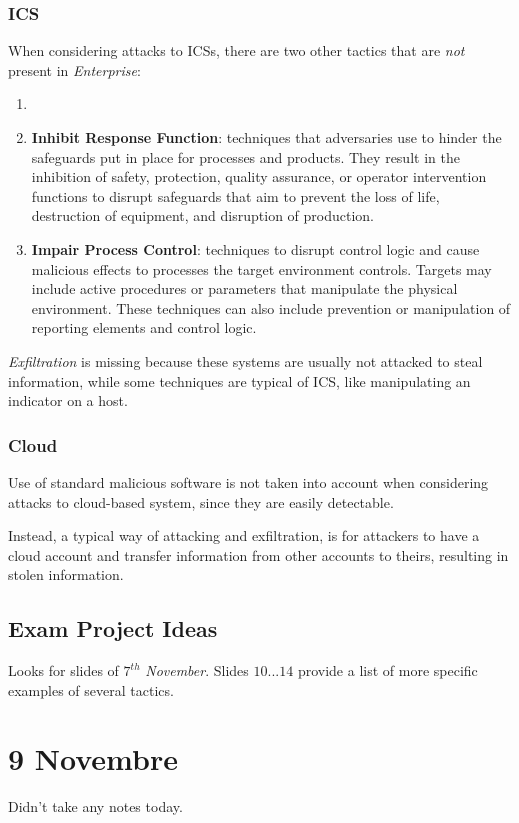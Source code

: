 \subsubsection{ICS}
When considering attacks to ICSs,
there are two other tactics that are \textit{not} present in \textit{Enterprise}:
\begin{enumerate}
   \item 
   \item \textbf{Inhibit Response Function}:
   techniques that adversaries use to hinder the
   safeguards put in place for processes and products.
   They result in the inhibition of
   safety, protection, quality assurance, or operator intervention functions to
   disrupt safeguards that aim to prevent the loss of life, destruction of
   equipment, and disruption of production.
   \item \textbf{Impair Process Control}:
   techniques to disrupt control logic and cause
   malicious effects to processes the target environment controls. 
   Targets may include active procedures or parameters that manipulate the
   physical environment. These techniques can also include prevention or
   manipulation of reporting elements and control logic.
\end{enumerate}

\textit{Exfiltration} is missing because these systems are usually not attacked to steal information,
while some techniques are typical of ICS,
like manipulating an indicator on a host.

\subsubsection{Cloud}
Use of standard malicious software is not taken into account when considering attacks to cloud-based system,
since they are easily detectable.

Instead, a typical way of attacking and exfiltration,
is for attackers to have a cloud account and transfer information from other accounts to theirs,
resulting in stolen information.

\subsection{Exam Project Ideas}
Looks for slides of $7^{th}$ \textit{November}.
Slides $10...14$ provide a list of more specific examples of several tactics.

\section{9 Novembre}
Didn't take any notes today.
